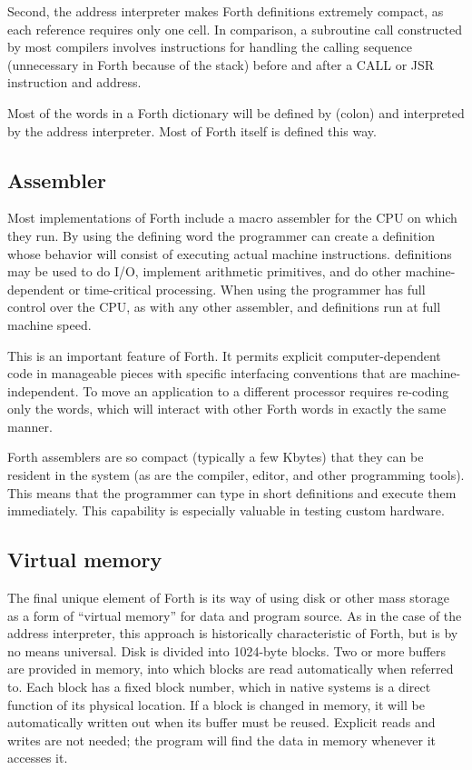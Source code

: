 Second, the address interpreter makes Forth definitions extremely
compact, as each reference requires only one cell. In comparison,
a subroutine call constructed by most compilers involves instructions
for handling the calling sequence (unnecessary in Forth because of
the stack) before and after a CALL or JSR instruction and address.

Most of the words in a Forth dictionary will be defined by
\word{:} (colon) and interpreted by the address interpreter.
Most of Forth itself is defined this way.

\subsection{Assembler} %

Most implementations of Forth include a macro assembler for the CPU
on which they run. By using the defining word  the
programmer can create a definition whose behavior will consist of
executing actual machine instructions.  definitions
may be used to do I/O, implement arithmetic primitives, and do other
machine-dependent or time-critical processing. When using
 the programmer has full control over the CPU, as
with any other assembler, and  definitions run at
full machine speed.

This is an important feature of Forth. It permits explicit
computer-dependent code in manageable pieces with specific interfacing
conventions that are machine-independent. To move an application to a
different processor requires re-coding only the 
words, which will interact with other Forth words in exactly the same
manner.

Forth assemblers are so compact (typically a few Kbytes) that they
can be resident in the system (as are the compiler, editor, and other
programming tools). This means that the programmer can type in short
 definitions and execute them immediately. This
capability is especially valuable in testing custom hardware.

\subsection{Virtual memory} %

The final unique element of Forth is its way of using disk or other
mass storage as a form of ``virtual memory'' for data and program
source. As in the case of the address interpreter, this approach is
historically characteristic of Forth, but is by no means universal.
Disk is divided into 1024-byte blocks. Two or more buffers are
provided in memory, into which blocks are read automatically when
referred to. Each block has a fixed block number, which in native
systems is a direct function of its physical location. If a block is
changed in memory, it will be automatically written out when its
buffer must be reused. Explicit reads and writes are not needed;
the program will find the data in memory whenever it accesses it.

